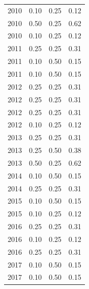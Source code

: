 \begin{table}[H]
\begin{tabular}{| l | c | c | c |}
  2010
    & 0.10
    & 0.25
    & {\color{red} 0.12} \\
  2010
    & 0.50
    & 0.25
    & {\color{blue} 0.62} \\
  2010
    & 0.10
    & 0.25
    & {\color{red} 0.12} \\
\hline
  2011
    & 0.25
    & 0.25
    & {\color{red} 0.31} \\
  2011
    & 0.10
    & 0.50
    & {\color{red} 0.15} \\
  2011
    & 0.10
    & 0.50
    & {\color{red} 0.15} \\
\hline
  2012
    & 0.25
    & 0.25
    & {\color{red} 0.31} \\
  2012
    & 0.25
    & 0.25
    & {\color{red} 0.31} \\
  2012
    & 0.25
    & 0.25
    & {\color{red} 0.31} \\
  2012
    & 0.10
    & 0.25
    & {\color{red} 0.12} \\
\hline
  2013
    & 0.25
    & 0.25
    & {\color{red} 0.31} \\
  2013
    & 0.25
    & 0.50
    & {\color{red} 0.38} \\
  2013
    & 0.50
    & 0.25
    & {\color{blue} 0.62} \\
\hline
  2014
    & 0.10
    & 0.50
    & {\color{red} 0.15} \\
  2014
    & 0.25
    & 0.25
    & {\color{red} 0.31} \\
\hline
  2015
    & 0.10
    & 0.50
    & {\color{red} 0.15} \\
  2015
    & 0.10
    & 0.25
    & {\color{red} 0.12} \\
\hline
  2016
    & 0.25
    & 0.25
    & {\color{red} 0.31} \\
  2016
    & 0.10
    & 0.25
    & {\color{red} 0.12} \\
  2016
    & 0.25
    & 0.25
    & {\color{red} 0.31} \\
\hline
  2017
    & 0.10
    & 0.50
    & {\color{red} 0.15} \\
  2017
    & 0.10
    & 0.50
    & {\color{red} 0.15} \\
\hline
\end{tabular}
\end{table}
